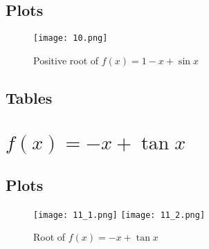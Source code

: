 \documentclass{article}
\begin{document}
\subsection{Plots}
\begin{figure}[!h]
    \centering
    \texttt{[image: 10.png]}
    \caption{Positive root of $f(x) = 1 -x +\sin{x}$}
\end{figure}
\subsection{Tables}
\begin{table}[!h]
\caption{Positive Root of $f(x) = 1 -x +\sin{x}$}
\end{table}



\newpage
\section{$f(x) = -x +\tan{x}$}
\subsection{Plots}
\begin{figure}[!h]
    \centering
    \texttt{[image: 11\_1.png]}
    \texttt{[image: 11\_2.png]}
    \caption{Root of $f(x) = -x +\tan{x}$}
\end{figure}
\end{document}
